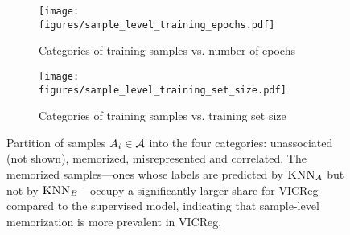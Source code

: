 \begin{figure}[ht]
     \centering
     \begin{subfigure}[b]{0.49\textwidth}
         \centering
         \texttt{[image: figures/sample\_level\_training\_epochs.pdf]}
         \caption{Categories of training samples vs. number of epochs}
         \label{fig:sample level epochs}
     \end{subfigure}
     \hfill
     \begin{subfigure}[b]{0.49\textwidth}
         \centering
         \texttt{[image: figures/sample\_level\_training\_set\_size.pdf]}
         \caption{Categories of training samples vs. training set size}
         \label{fig:sample level training size}
     \end{subfigure}
\caption[Partition of samples $A_i \in \calA$ into the four categories]{
Partition of samples $A_i \in \calA$ into the four categories: unassociated (not shown), memorized, misrepresented and correlated. The memorized samples---ones whose labels are predicted by $\textsc{KNN}_A$ but not by $\textsc{KNN}_B$---occupy a significantly larger share for VICReg compared to the supervised model, indicating that sample-level \dejavu memorization is more prevalent in VICReg. %
}
\label{fig:partition attack main appendix}
\end{figure}
